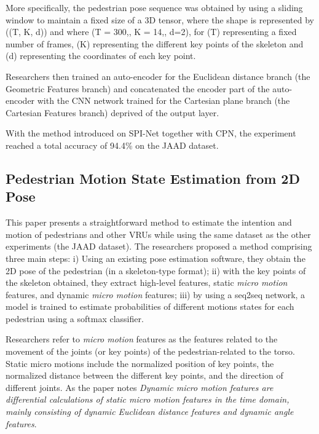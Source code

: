 \documentclass[
]{article}
\begin{document}
More specifically, the pedestrian pose sequence was obtained by using a
sliding window to maintain a fixed size of a 3D tensor, where the shape
is represented by ((T, K, d)) and where (T = 300,, K = 14,, d=2), for
(T) representing a fixed number of frames, (K) representing the
different key points of the skeleton and (d) representing the
coordinates of each key point.

Researchers then trained an auto-encoder for the Euclidean distance
branch (the Geometric Features branch) and concatenated the encoder part
of the auto-encoder with the CNN network trained for the Cartesian plane
branch (the Cartesian Features branch) deprived of the output layer.

With the method introduced on SPI-Net together with CPN, the experiment
reached a total accuracy of 94.4\% on the JAAD dataset.

\hypertarget{pedestrian-motion-state-estimation-from-2d-pose}{%
\subsection{Pedestrian Motion State Estimation from 2D
Pose}\label{pedestrian-motion-state-estimation-from-2d-pose}}

This paper presents a straightforward method to estimate the intention
and motion of pedestrians and other VRUs while using the same dataset as
the other experiments (the JAAD dataset). The researchers proposed a
method comprising three main steps: i) Using an existing pose estimation
software, they obtain the 2D pose of the pedestrian (in a skeleton-type
format); ii) with the key points of the skeleton obtained, they extract
high-level features, static \emph{micro motion} features, and dynamic
\emph{micro motion} features; iii) by using a seq2seq network, a model
is trained to estimate probabilities of different motions states for
each pedestrian using a softmax classifier.

Researchers refer to \emph{micro motion} features as the features
related to the movement of the joints (or key points) of the
pedestrian-related to the torso. Static micro motions include the
normalized position of key points, the normalized distance between the
different key points, and the direction of different joints. As the
paper notes \emph{Dynamic micro motion features are differential
calculations of static micro motion features in the time domain, mainly
consisting of dynamic Euclidean distance features and dynamic angle
features}.
\end{document}
